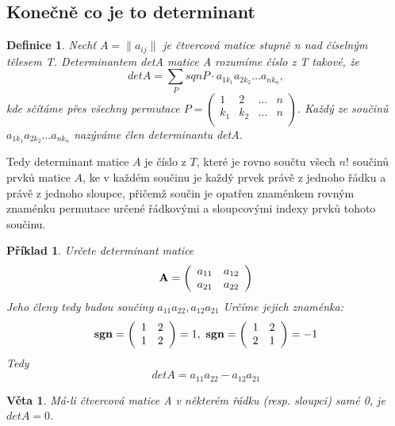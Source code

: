 \documentclass[12pt,a4paper]{article}
\newtheorem{definition}{Definice}
\newtheorem{sentence}{Věta}
\newtheorem{example}{Příklad}
\begin{document}
\subsection{Konečně co je to determinant}
\begin{definition}
	Nechť $A = \| a_{ij} \|$ je čtvercová matice stupně n nad číselným tělesem T. Determinantem detA matice A rozumíme číslo z T takové, že $$detA =  \sum_P sqnP \cdot a_{1k_1}a_{2k_2} \dots a_{nk_n},$$ kde sčítáme přes všechny permutace $P = \left( \begin{array}{cccc} 1 & 2 & \dots & n\\ k_1 & k_2 & \dots & n \\ \end{array} \right)$. Každý ze součinů \\$a_{1k_1}a_{2k_2} \dots a_{nk_n}$ nazýváme člen determinantu detA.
\end{definition}
Tedy determinant matice $A$ je číslo z $T$, které je rovno součtu všech $n!$ součinů prvků matice $A$, ke v každém součinu je každý prvek právě z jednoho řádku a právě z jednoho sloupce, přičemž součin je opatřen znaménkem rovným znaménku permutace určené řádkovými a sloupcovými indexy prvků tohoto součinu.

\begin{example}
	Určete determinant matice
	\begin{displaymath}
{\bf A} =
\left( \begin{array}{cc}
a_{11} & a_{12}  \\
a_{21} & a_{22}  \\
\end{array} \right)
\end{displaymath}
Jeho členy tedy budou součiny $a_{11}a_{22}, a_{12}a_{21}$ Určíme jejich znaménka:
	\begin{displaymath}
{\bf sgn} =
\left( \begin{array}{cc} 1 & 2  \\ 1 & 2  \\ \end{array} \right) = 1,\
{\bf sgn} = \left( \begin{array}{cc} 1 & 2  \\ 2 & 1 \\ \end{array} \right) = -1
\end{displaymath}
Tedy $$detA = a_{11}a_{22} - a_{12}a_{21}$$
\end{example}

\begin{sentence}
	Má-li čtvercová matice A v některém řádku (resp. sloupci) samé 0, je $detA = 0$.
\end{sentence}
\end{document}

